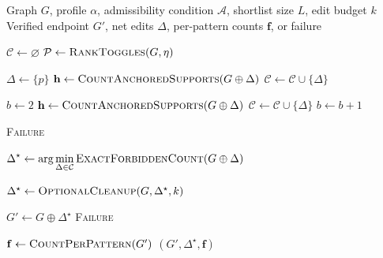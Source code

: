 \documentclass[11pt,twocolumn]{article}
\begin{document}
\begin{algorithm}
	\caption{\textsc{Cross-Forbidden}}
	\label{alg:cross-forbidden}
	\begin{algorithmic}[1]
		\Require Graph $G$, profile $\alpha$, admissibility condition
		$\mathcal{A}$, shortlist size $L$, edit budget $k$
		\Ensure Verified endpoint $G'$, net edits $\Delta$,
		per-pattern counts $\mathbf{f}$, or failure
		
		\State {}
		\State $\mathcal{C} \gets \varnothing$
		\State $\mathcal{P} \gets \Call{RankToggles}{G,\eta}$
		
		\State $\Delta \gets \{p\}$
		\State $\mathbf{h} \gets
		\Call{CountAnchoredSupports}{G \oplus \Delta}$
		\State $\mathcal{C} \gets \mathcal{C} \cup \{\Delta\}$
		\EndIf
		\EndIf
		\EndFor
		
		\State $b \gets 2$
		\State $\mathbf{h} \gets
		\Call{CountAnchoredSupports}{G \oplus \Delta}$
		\State $\mathcal{C} \gets \mathcal{C} \cup \{\Delta\}$
		\EndIf
		\EndFor
		\State $b \gets b+1$
		\EndWhile
		
		\State \Return \textsc{Failure}
		\EndIf
		
		\State $\displaystyle
		\Delta^\star \gets
		\arg\min_{\Delta \in \mathcal{C}}
		\Call{ExactForbiddenCount}{G \oplus \Delta}$
		
		\State $\Delta^\star \gets
		\Call{OptionalCleanup}{G,\Delta^\star,k}$
		
		\State $G' \gets G \oplus \Delta^\star$
		\State \Return \textsc{Failure}
		\EndIf
		
		\State $\mathbf{f} \gets \Call{CountPerPattern}{G'}$
		\State \Return $(G',\Delta^\star,\mathbf{f})$
		
	\end{algorithmic}
\end{algorithm}
\end{document}
